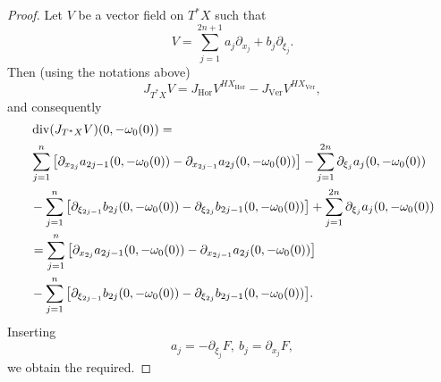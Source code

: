 \documentclass{article}
\DeclareMathOperator{\Div}{div}
\DeclareMathOperator{\Hor}{Hor}
\DeclareMathOperator{\Ver}{Ver}
\begin{document}
\begin{proof}
%
Let $V$ be a vector field on $T^*X$ such that
%
$$V = \sum_{j=1}^{2n+1} a_j \partial_{x_j} + b_j \partial_{\xi_j}.$$
Then (using the notations above) $$J_{T^*X} V = J_{\Hor} V^{HX_{\Hor}} - J_{\Ver} V^{HX_{\Ver}},$$
and consequently $$\begin{aligned} &\Div(J_{T^*X} V)(0, -\omega_0(0)) =\\ &\sum_{j=1}^n \big{[}\partial_{x_{2j}} a_{2j-1}(0, -\omega_0(0)) - \partial_{x_{2j-1}} a_{2j}(0,-\omega_0(0))\big{]} - \sum_{j=1}^{2n} \partial_{\xi_j} a_j(0, -\omega_0(0))\\ &-\sum_{j=1}^n \big{[} \partial_{\xi_{2j-1}} b_{2j}(0, -\omega_0(0)) - \partial_{\xi_{2j}} b_{2j-1}(0, -\omega_0(0)) \big{]} +\sum_{j=1}^{2n} \partial_{\xi_j} a_j(0, -\omega_0(0))\\ &=\sum_{j=1}^n \big{[}\partial_{x_{2j}} a_{2j-1}(0, -\omega_0(0)) - \partial_{x_{2j-1}} a_{2j}(0,-\omega_0(0))\big{]}\\ &-\sum_{j=1}^n \big{[} \partial_{\xi_{2j-1}} b_{2j}(0, -\omega_0(0)) - \partial_{\xi_{2j}} b_{2j-1}(0, -\omega_0(0)) \big{]}.\end{aligned}$$
Inserting $$a_j = -\partial_{\xi_j} F,\ b_j = \partial_{x_j} F,$$
we obtain the required.
\end{proof}
%
%
\end{document}
